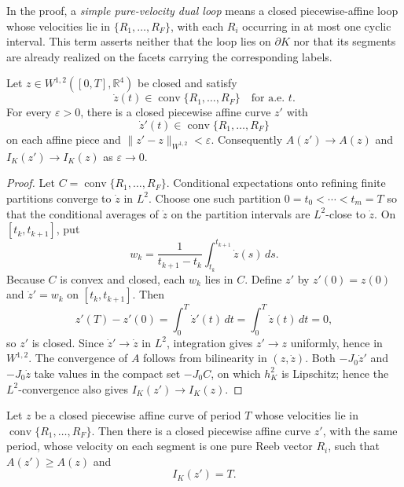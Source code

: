 In the proof, a \emph{simple pure-velocity dual loop} means a closed
piecewise-affine loop whose velocities lie in \(\{R_1,\ldots,R_F\}\), with
each \(R_i\) occurring in at most one cyclic interval.  This term asserts
neither that the loop lies on \(\partial K\) nor that its segments are already
realized on the facets carrying the corresponding labels.

\begin{lemma}\label{lem:generalized-reeb-pw-affine-approx}
Let \(z\in W^{1,2}([0,T],\mathbb{R}^4)\) be closed and satisfy
\[
  \dot z(t)\in\operatorname{conv}\{R_1,\ldots,R_F\}
  \quad\text{for a.e. }t.
\]
For every \(\varepsilon>0\), there is a closed piecewise affine curve \(z'\)
with
\[
  \dot z'(t)\in\operatorname{conv}\{R_1,\ldots,R_F\}
\]
on each affine piece and \(\|z'-z\|_{W^{1,2}}<\varepsilon\). Consequently
\(A(z')\to A(z)\) and \(I_K(z')\to I_K(z)\) as \(\varepsilon\to0\).
\end{lemma}

\begin{proof}
Let \(C=\operatorname{conv}\{R_1,\ldots,R_F\}\). Conditional expectations onto
refining finite partitions converge to \(\dot z\) in \(L^2\). Choose one such
partition \(0=t_0<\cdots<t_m=T\) so that the conditional averages of
\(\dot z\) on the partition intervals are \(L^2\)-close to \(\dot z\). On
\([t_k,t_{k+1}]\), put
\[
  w_k=\frac{1}{t_{k+1}-t_k}\int_{t_k}^{t_{k+1}}\dot z(s)\,ds.
\]
Because \(C\) is convex and closed, each \(w_k\) lies in \(C\). Define \(z'\)
by \(z'(0)=z(0)\) and \(\dot z'=w_k\) on \([t_k,t_{k+1}]\). Then
\[
  z'(T)-z'(0)=\int_0^T\dot z'(t)\,dt=\int_0^T\dot z(t)\,dt=0,
\]
so \(z'\) is closed. Since \(\dot z'\to\dot z\) in \(L^2\), integration gives
\(z'\to z\) uniformly, hence in \(W^{1,2}\). The convergence of \(A\) follows
from bilinearity in \((z,\dot z)\). Both \(-J_0\dot z'\) and
\(-J_0\dot z\) take values in the compact set \(-J_0C\), on which
\(h_K^2\) is Lipschitz; hence the
\(L^2\)-convergence also gives \(I_K(z')\to I_K(z)\).
\end{proof}

\begin{lemma}\label{lem:generalized-reeb-splitting}
Let \(z\) be a closed piecewise affine curve of period \(T\) whose velocities
lie in \(\operatorname{conv}\{R_1,\ldots,R_F\}\). Then there is a closed
piecewise affine curve \(z'\), with the same period, whose velocity on each
segment is one pure Reeb vector \(R_i\), such that \(A(z')\geq A(z)\) and
\[
  I_K(z')=T.
\]
\end{lemma}

